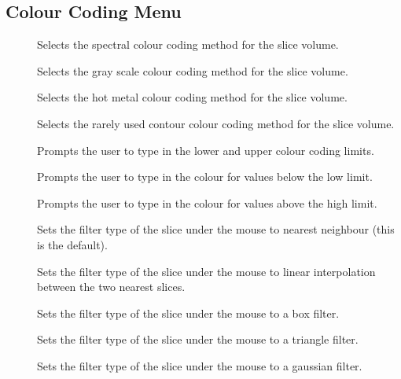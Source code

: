 \subsection{Colour Coding Menu}

\begin{description}
\item[]  Selects the spectral colour coding
                                          method for the slice volume.
\item[]  Selects the gray scale colour coding
                                          method for the slice volume.
\item[]  Selects the hot metal colour coding
                                          method for the slice volume.
\item[]  Selects the rarely used contour
                                    colour coding method for the slice volume.
\item[]  Prompts the user to type in the lower
                                    and upper colour coding limits.
\item[]  Prompts the user to type in
                                   the colour for values below the low limit.
\item[]  Prompts the user to type in
                                   the colour for values above the high limit.
\item[]  Sets the filter type of
                       the slice under the mouse to nearest neighbour (this is
                       the default).
\item[]  Sets the filter type of
                       the slice under the mouse to linear interpolation
                       between the two nearest slices.
\item[]  Sets the filter type of
                       the slice under the mouse to a box filter.
\item[]  Sets the filter type of
                       the slice under the mouse to a triangle filter.
\item[]  Sets the filter type of
                       the slice under the mouse to a gaussian filter.

\end{description}
